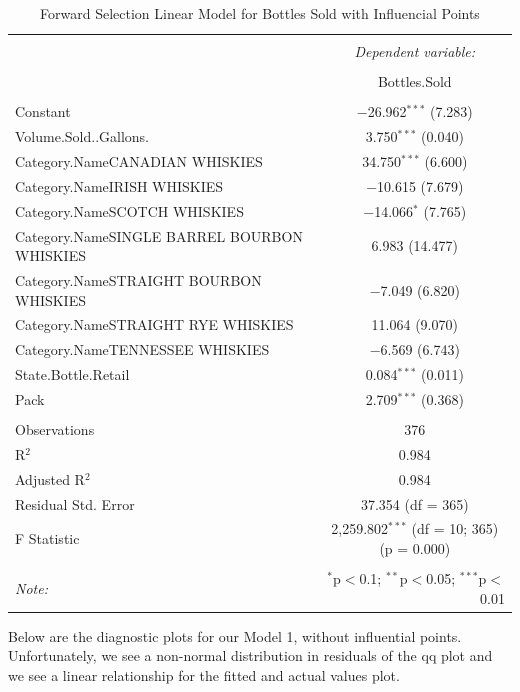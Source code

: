 \documentclass[]{elsarticle} %
\begin{document}
\begin{table}[!htbp] \centering 
  \caption{Forward Selection Linear Model for Bottles Sold with Influencial Points} 
  \label{} 
\normalsize 
\begin{tabular}{@{\extracolsep{5pt}}lc} 
\\[-1.8ex]\hline 
\hline \\[-1.8ex] 
 & \multicolumn{1}{c}{\textit{Dependent variable:}} \\ 
\cline{2-2} 
\\[-1.8ex] & Bottles.Sold \\ 
\hline \\[-1.8ex] 
 Constant & $-$26.962$^{***}$ (7.283) \\ 
  Volume.Sold..Gallons. & 3.750$^{***}$ (0.040) \\ 
  Category.NameCANADIAN WHISKIES & 34.750$^{***}$ (6.600) \\ 
  Category.NameIRISH WHISKIES & $-$10.615 (7.679) \\ 
  Category.NameSCOTCH WHISKIES & $-$14.066$^{*}$ (7.765) \\ 
  Category.NameSINGLE BARREL BOURBON WHISKIES & 6.983 (14.477) \\ 
  Category.NameSTRAIGHT BOURBON WHISKIES & $-$7.049 (6.820) \\ 
  Category.NameSTRAIGHT RYE WHISKIES & 11.064 (9.070) \\ 
  Category.NameTENNESSEE WHISKIES & $-$6.569 (6.743) \\ 
  State.Bottle.Retail & 0.084$^{***}$ (0.011) \\ 
  Pack & 2.709$^{***}$ (0.368) \\ 
 \hline \\[-1.8ex] 
Observations & 376 \\ 
R$^{2}$ & 0.984 \\ 
Adjusted R$^{2}$ & 0.984 \\ 
Residual Std. Error & 37.354 (df = 365) \\ 
F Statistic & 2,259.802$^{***}$ (df = 10; 365)  (p = 0.000) \\ 
\hline 
\hline \\[-1.8ex] 
\textit{Note:}  & \multicolumn{1}{r}{$^{*}$p$<$0.1; $^{**}$p$<$0.05; $^{***}$p$<$0.01} \\ 
\end{tabular} 
\end{table}

Below are the diagnostic plots for our Model 1, without influential
points. Unfortunately, we see a non-normal distribution in residuals of
the qq plot and we see a linear relationship for the fitted and actual
values plot.
\end{document}
